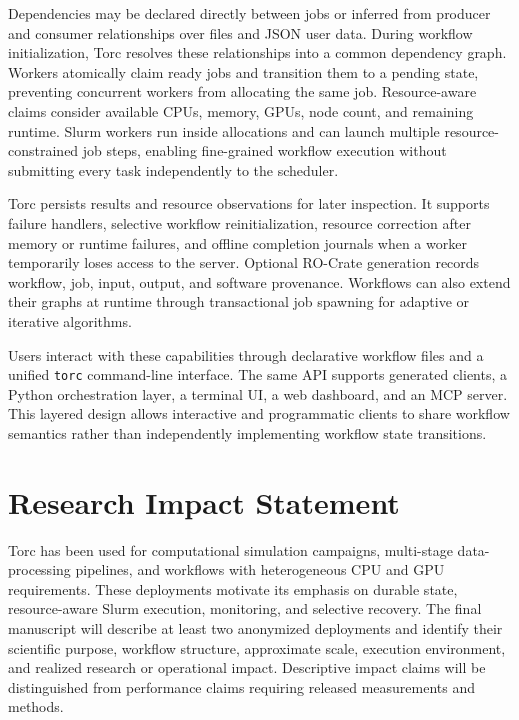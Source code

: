 \documentclass[11pt]{article}
\begin{document}
Dependencies may be declared directly between jobs or inferred from producer and consumer
relationships over files and JSON user data. During workflow initialization, Torc resolves these
relationships into a common dependency graph. Workers atomically claim ready jobs and transition
them to a pending state, preventing concurrent workers from allocating the same job. Resource-aware
claims consider available CPUs, memory, GPUs, node count, and remaining runtime. Slurm workers run
inside allocations and can launch multiple resource-constrained job steps, enabling fine-grained
workflow execution without submitting every task independently to the scheduler.

Torc persists results and resource observations for later inspection. It supports failure handlers,
selective workflow reinitialization, resource correction after memory or runtime failures, and
offline completion journals when a worker temporarily loses access to the server. Optional RO-Crate
generation \citep{soilandreyes2022rocrate} records workflow, job, input, output, and software
provenance. Workflows can also extend their graphs at runtime through transactional job spawning for
adaptive or iterative algorithms.

Users interact with these capabilities through declarative workflow files and a unified
\texttt{torc} command-line interface. The same API supports generated clients, a Python
orchestration layer, a terminal UI, a web dashboard, and an MCP server. This layered design allows
interactive and programmatic clients to share workflow semantics rather than independently
implementing workflow state transitions.

\section{Research Impact Statement}

Torc has been used for computational simulation campaigns, multi-stage data-processing pipelines,
and workflows with heterogeneous CPU and GPU requirements. These deployments motivate its emphasis
on durable state, resource-aware Slurm execution, monitoring, and selective recovery. The final
manuscript will describe at least two anonymized deployments and identify their scientific purpose,
workflow structure, approximate scale, execution environment, and realized research or operational
impact. Descriptive impact claims will be distinguished from performance claims requiring released
measurements and methods.
\end{document}
